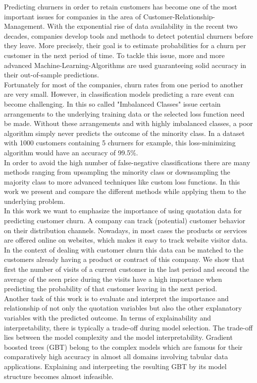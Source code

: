 \documentclass[12pt,titlepage]{article}
\begin{document}
Predicting churners in order to retain customers has become one of the most important issues for companies in the area of Customer-Relationship-Management. With the exponential rise of data availability in the recent two decades, companies develop tools and methods to detect potential churners before they leave. More precisely, their goal is to estimate probabilities for a churn per customer in the next period of time. To tackle this issue, more and more advanced Machine-Learning-Algorithms are used guaranteeing solid accuracy in their out-of-sample predictions. \\
Fortunately for most of the companies, churn rates from one period to another are very small. However, in classification
models predicting a rare event can become challenging. In this so called "Imbalanced Classes" issue certain arrangements to the underlying training data or the selected loss function need be made. Without these arrangements and with highly imbalanced classes, a poor algorithm simply never predicts the outcome of the minority class. In a dataset with 1000 customers containing 5 churners for example, this loss-minimizing algorithm would have an accuracy of 99.5\%. \\
In order to avoid the high number of false-negative classifications there are many methods ranging from upsampling the
minority class or downsampling the majority class to more advanced techniques like custom loss functions. In this work we present and compare the different methods while applying them to the underlying problem. \\
In this work we want to emphasize the importance of using quotation data for predicting customer churn. A company can
track (potential) customer behavior on their distribution channels. Nowadays, in most cases the products or services are
offered online on websites, which makes it easy to track website visitor data. In the context of dealing with customer
churn this data can be matched to the customers already having a product or contract of this company. We show that first the number of visits of a current customer in the last period and second the average of the seen price during the visits have a high importance when predicting the probability of that customer leaving in the next period. \\
Another task of this work is to evaluate and interpret the importance and relationship of not only the quotation variables but also the other explanatory variables with the predicted outcome. In terms of explainability and interpretability, there is typically a trade-off during model selection. The trade-off lies between the model complexity and the model interpretability. Gradient boosted trees (GBT) belong to the complex models which are famous for their comparatively high accuracy in almost all domains involving tabular data applications. Explaining and interpreting the resulting GBT by its model structure becomes almost infeasible. \\
\end{document}
